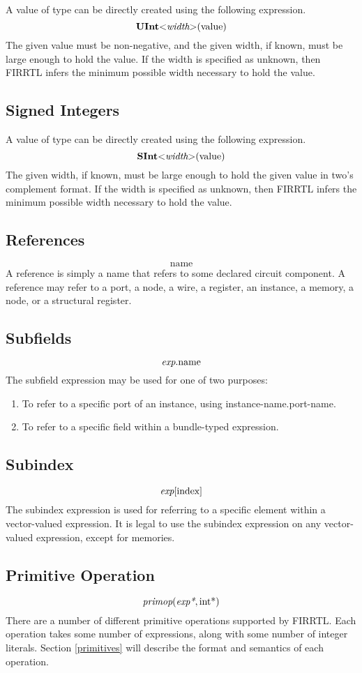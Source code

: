 \documentclass[12pt]{article}
\begin{document}
A value of type  can be directly created using the following expression.
\[
\text{\bf UInt}\text{\bf $<$} \text{\em width} \text{\bf $>$}(\text{value})
\]
The given value must be non-negative, and the given width, if known, must be large enough to hold the value.
If the width is specified as unknown, then FIRRTL infers the minimum possible width necessary to hold the value.

\subsection{Signed Integers}

A value of type  can be directly created using the following expression.
\[
\text{\bf SInt}\text{\bf $<$} \text{\em width} \text{\bf $>$}(\text{value})
\]
The given width, if known, must be large enough to hold the given value in two's complement format.
If the width is specified as unknown, then FIRRTL infers the minimum possible width necessary to hold the value.

\subsection{References}
\[
\text{name}
\]
A reference is simply a name that refers to some declared circuit component.
A reference may refer to a port, a node, a wire, a register, an instance, a memory, a node, or a structural register.

\subsection{Subfields}
\[
\text{\em exp}.\text{name}
\]
The subfield expression may be used for one of two purposes:
\begin{enumerate}
\item To refer to a specific port of an instance, using instance-name.port-name. 
\item To refer to a specific field within a bundle-typed expression.
\end{enumerate}

\subsection{Subindex}
\[
\text{\em exp}[\text{index}]
\]
The subindex expression is used for referring to a specific element within a vector-valued expression.
It is legal to use the subindex expression on any vector-valued expression, except for memories. 

\subsection{Primitive Operation}
\[
\text{\em primop}(\text{\em exp*}, \text{int}\text{*})
\]
There are a number of different primitive operations supported by FIRRTL. 
Each operation takes some number of expressions, along with some number of integer literals.
Section \ref{primitives} will describe the format and semantics of each operation.
\end{document}
